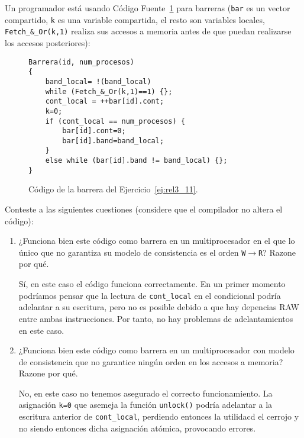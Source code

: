 \begin{ejercicio}\label{ej:rel3_11}
    Un programador está usando Código Fuente~\ref{cod:ej_rel3_11} para barreras (\verb|bar| es un vector compartido, \verb|k|
    es una variable compartida, el resto son variables locales, \verb|Fetch_&_Or(k,1)| realiza sus accesos a memoria
    antes de que puedan realizarse los accesos posteriores):
    \begin{figure}[H]
        \centering
        \begin{verbatim}
Barrera(id, num_procesos)
{
    band_local= !(band_local)
    while (Fetch_&_Or(k,1)==1) {};
    cont_local = ++bar[id].cont;
    k=0;
    if (cont_local == num_procesos) {
        bar[id].cont=0;
        bar[id].band=band_local;
    }
    else while (bar[id].band != band_local) {};
}
        \end{verbatim}
        \caption{Código de la barrera del Ejercicio~\ref{ej:rel3_11}.}
        \label{cod:ej_rel3_11}
    \end{figure}
    Conteste a las siguientes cuestiones (considere que el compilador no altera el código):
    \begin{enumerate}
        \item ¿Funciona bien este código como barrera en un multiprocesador en el que lo único que no garantiza su
        modelo de consistencia es el orden \verb|W|$\rightarrow$\verb|R|? Razone por qué.

        Sí, en este caso el código funciona correctamente. En un primer momento podríamos pensar que
        la lectura de \verb|cont_local| en el condicional podría adelantar a su escritura, pero no es posible debido a que hay depencias RAW entre ambas instrucciones.
        Por tanto, no hay problemas de adelantamientos en este caso.
        \item ¿Funciona bien este código como barrera en un multiprocesador con modelo de consistencia que no
        garantice ningún orden en los accesos a memoria? Razone por qué.

        No, en este caso no tenemos asegurado el correcto funcionamiento. La asignación \verb|k=0| que asemeja la función \verb|unlock()| podría adelantar a la escritura anterior de \verb|cont_local|,
        perdiendo entonces la utilidacd el cerrojo y no siendo entonces dicha asignación atómica, provocando errores.
    \end{enumerate}
\end{ejercicio}



